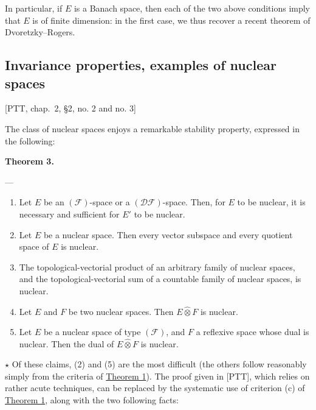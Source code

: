 \documentclass[british]{article}
\providecommand{\tightlist}{%
\setlength{\itemsep}{0pt}\setlength{\parskip}{0pt}}
\newenvironment{itenv}[1]
  {\phantomsection\par\smallskip\noindent\textbf{#1.}\itshape}
  {\par\smallskip}
\newcommand{\oldpage}[1]{\marginpar{\footnotesize$\Big\vert$ \textit{p.~#1}}}
\begin{document}
In particular, if \(E\) is a Banach space, then each of the two above
conditions imply that \(E\) is of finite dimension: in the first case,
we thus recover a recent theorem of Dvoretzky--Rogers.

\subsection{Invariance properties, examples of nuclear
spaces}\label{section-2.3}

{[}PTT, chap.~2, §2, no. 2 and no. 3{]}

The class of nuclear spaces enjoys a remarkable stability property,
expressed in the following:

\oldpage{102}

\protect{}\label{section-2-theorem-3}
\begin{itenv}{Theorem 3}

---

\begin{enumerate}
\def\labelenumi{\arabic{enumi}.}
\tightlist
\item
  Let \(E\) be an \((\mathscr{F})\)-space or a \((\mathscr{DF})\)-space.
  Then, for \(E\) to be nuclear, it is necessary and sufficient for
  \(E'\) to be nuclear.
\item
  Let \(E\) be a nuclear space. Then every vector subspace and every
  quotient space of \(E\) is nuclear.
\item
  The topological-vectorial product of an arbitrary family of nuclear
  spaces, and the topological-vectorial sum of a countable family of
  nuclear spaces, is nuclear.
\item
  Let \(E\) and \(F\) be two nuclear spaces. Then \(E\hat{\otimes}F\) is
  nuclear.
\item
  Let \(E\) be a nuclear space of type \((\mathscr{F})\), and \(F\) a
  reflexive space whose dual is nuclear. Then the dual of
  \(E\hat{\otimes}F\) is nuclear.
\end{enumerate}

\end{itenv}

\(\star\) Of these claims, (2) and (5) are the most difficult (the
others follow reasonably simply from the criteria of
\hyperref[section-2-theorem-1]{Theorem 1}). The proof given in
{[}PTT{]}, which relies on rather acute techniques, can be replaced by
the systematic use of criterion (c) of
\hyperref[section-2-theorem-1]{Theorem 1}, along with the two following
facts:
\end{document}
